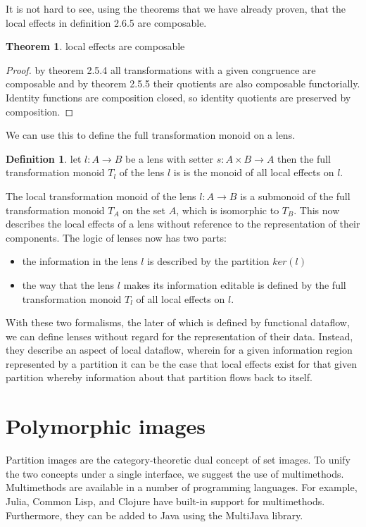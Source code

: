 \documentclass[a4paper,11pt, notitlepage]{report}
\theoremstyle{definition}
\newtheorem{definition}{Definition}[section]
\newtheorem{theorem}{Theorem}[section]
\begin{document}
It is not hard to see, using the theorems that we have already proven, that the local effects in definition 2.6.5 are composable.

\begin{theorem}
local effects are composable
\end{theorem}

\begin{proof}
by theorem 2.5.4 all transformations with a given congruence are composable and by theorem 2.5.5 their quotients are also composable functorially. Identity functions are composition closed, so identity quotients are preserved by composition.
\end{proof}

We can use this to define the full transformation monoid on a lens.

\begin{definition}
let $l: A \to B$ be a lens with setter $s: A \times B \to A$ then the full transformation monoid $T_l$ of the lens $l$ is is the monoid of all local effects on $l$.
\end{definition}

The local transformation monoid of the lens $l: A \to B$ is a submonoid of the full transformation monoid $T_A$ on the set $A$, which is isomorphic to $T_B$. This now describes the local effects of a lens without reference to the representation of their components. The logic of lenses now has two parts:

\begin{itemize}
 \item the information in the lens $l$ is described by the partition $ker(l)$
 \item the way that the lens $l$ makes its information editable is defined by the full transformation monoid $T_l$ of all local effects on $l$.
\end{itemize}

With these two formalisms, the later of which is defined by functional dataflow, we can define lenses without regard for the representation of their data. Instead, they describe an aspect of local dataflow, wherein for a given information region represented by a partition it can be the case that local effects exist for that given partition whereby information about that partition flows back to itself.

\newpage

\chapter{Polymorphic images}
Partition images are the category-theoretic dual concept of set images. To unify the two concepts under a single interface, we suggest the use of multimethods. Multimethods are available in a number of programming languages. For example, Julia, Common Lisp, and Clojure have built-in support for multimethods. Furthermore, they can be added to Java using the MultiJava library.
\end{document}
